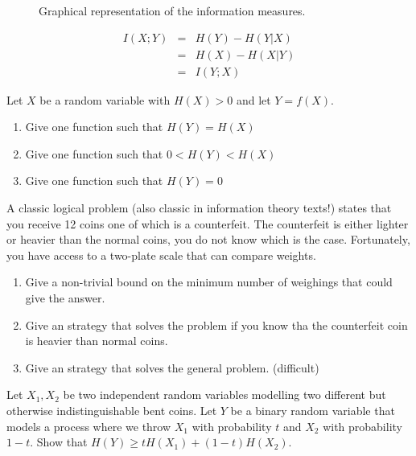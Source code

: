 \begin{figure}
\begin{center}
\def\svgwidth{.8\columnwidth} 
 
\caption{Graphical representation of the information measures.}
\label{fig:infmeasures}
\end{center}
\end{figure}

\begin{eqnarray}
\label{eq:mutualinformation}
I({X};{Y}) &=& H({Y}) - H({Y}|{X}) \nonumber\\
         &=& H({X}) - H({X}|{Y}) \nonumber\\
         &=& I({Y};{X})
\end{eqnarray}
\begin{exercise}
Let $X$ be a random variable with $H(X)>0$ and let $Y=f(X)$. 
\begin{enumerate}
\item Give one function such that $H(Y)=H(X)$
\item Give one function such that $0<H(Y)<H(X)$
\item Give one function such that $H(Y)=0$
\end{enumerate}
\end{exercise}
\begin{exercise}
A classic logical problem (also classic in information theory texts!) states that you receive 12 coins one of which is a counterfeit. The counterfeit is either lighter or heavier than the normal coins, you do not know which is the case. Fortunately, you have access to a two-plate scale that can compare weights.
\begin{enumerate}
\item Give a non-trivial bound on the minimum number of weighings that could give the answer.
\item Give an strategy that solves the problem if you know tha the counterfeit coin is heavier than normal coins.
\item Give an strategy that solves the general problem. (difficult)
\end{enumerate}
\end{exercise}
\begin{exercise}
Let $X_1,X_2$ be two independent random variables modelling two different but otherwise indistinguishable bent coins. 
Let $Y$ be a binary random variable that models a process where we throw $X_1$ with probability $t$ and $X_2$ with probability $1-t$. 
Show that $H(Y)\geq tH(X_1)+(1-t)H(X_2)$.
\end{exercise}
